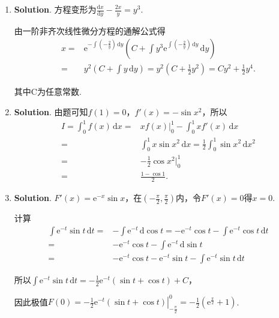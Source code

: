 \documentclass[../Main.tex]{subfiles}
\begin{document}
\begin{enumerate}
    \item \textbf{Solution}. 方程变形为$\frac{\mathrm{d}x}{\mathrm{d}y}-\frac{2x}{y}
              =y^{3}$.

          由一阶非齐次线性微分方程的通解公式得
          \[
              \begin{aligned}
                  x = & \mathrm{e}^{-\int\left(-\frac{2}{y}\right)\,\mathrm{d}y}\left(C+\int y^{3}\mathrm{e}^{\int\left(-\frac{2}{y}\right)\,\mathrm{d}y}\,\mathrm{d}y\right) \\
                  =   & y^{2}\left(C+\int y\,\mathrm{d}y\right) = y^{2}\left(C+\frac{1}{2}y^{2}\right) = Cy^{2}+\frac{1}{2}y^{4}.
              \end{aligned}
          \]

          其中C为任意常数.

    \item \textbf{Solution}. 由题可知$f(1)=0$，$f'(x)=-\sin x^{2}$，所以
          \[
              \begin{aligned}
                  I = \int_{0}^{1}f(x)\,\mathrm{d}x = & xf(x)\bigg|_{0}^{1}-\int_{0}^{1}x f'(x)\,\mathrm{d}x                                      \\
                  =                                   & \int_{0}^{1}x\sin x^{2}\,\mathrm{d}x = \frac{1}{2}\int_{0}^{1}\sin x^{2}\,\mathrm{d}x^{2} \\
                  =                                   & -\frac{1}{2}\cos x^{2}\bigg|_{0}^{1}                                                      \\
                  =                                   & \frac{1-\cos 1}{2}.
              \end{aligned}
          \]

    \item \textbf{Solution}. $F'(x)=\mathrm{e}^{-x}\sin x$，在$\left(-\frac{\pi}{2}
              ,\frac{\pi}{2}\right)$内，令$F'(x)=0$得$x=0$.

          计算
          \[
              \begin{aligned}
                  \int \mathrm{e}^{-t}\sin t\,\mathrm{d}t = & -\int \mathrm{e}^{-t}\,\mathrm{d}\cos t = -\mathrm{e}^{-t}\cos t - \int \mathrm{e}^{-t}\cos t\,\mathrm{d}t \\
                  =                                         & -\mathrm{e}^{-t}\cos t - \int \mathrm{e}^{-t}\,\mathrm{d}\sin t                                            \\
                  =                                         & -\mathrm{e}^{-t}\cos t - \mathrm{e}^{-t}\sin t - \int \mathrm{e}^{-t}\sin t\,\mathrm{d}t
              \end{aligned}
          \]

          所以$\int \mathrm{e}^{-t}\sin t\,\mathrm{d}t=-\frac{1}{2}\mathrm{e}^{-t}(\sin
              t+\cos t)+C$，

          因此极值$F(0)=\left.-\frac{1}{2}\mathrm{e}^{-t}(\sin t+\cos t)\right|_{-\frac{\pi}{2}}
              ^{0}=-\frac{1}{2}\left(\mathrm{e}^{\frac{\pi}{2}}+1\right)$.
\end{enumerate}
\end{document}
